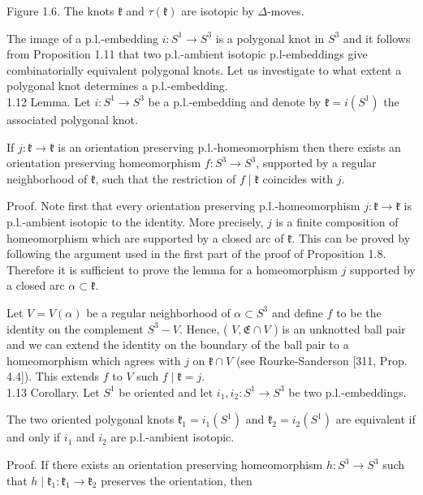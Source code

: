 \documentclass[10pt, letterpaper]{article}
\begin{document}
Figure 1.6. The knots $\mathfrak{k}$ and $\tau(\mathfrak{k})$ are isotopic by $\Delta$-moves.

The image of a p.l.-embedding $i: S^{1} \rightarrow S^{3}$ is a polygonal knot in $S^{3}$ and it follows from Proposition 1.11 that two p.l.-ambient isotopic p.l-embeddings give combinatorially equivalent polygonal knots. Let us investigate to what extent a polygonal knot determines a p.l.-embedding.\\
1.12 Lemma. Let $i: S^{1} \rightarrow S^{3}$ be a p.l.-embedding and denote by $\mathfrak{k}=i\left(S^{1}\right)$ the associated polygonal knot.

If $j: \mathfrak{k} \rightarrow \mathfrak{k}$ is an orientation preserving p.l.-homeomorphism then there exists an orientation preserving homeomorphism $f: S^{3} \rightarrow S^{3}$, supported by a regular neighborhood of $\mathfrak{k}$, such that the restriction of $f \mid \mathfrak{k}$ coincides with $j$.

Proof. Note first that every orientation preserving p.l.-homeomorphism $j: \mathfrak{k} \rightarrow \mathfrak{k}$ is p.l.-ambient isotopic to the identity. More precisely, $j$ is a finite composition of homeomorphism which are supported by a closed arc of $\mathfrak{k}$. This can be proved by following the argument used in the first part of the proof of Proposition 1.8. Therefore it is sufficient to prove the lemma for a homeomorphism $j$ supported by a closed arc $\alpha \subset \mathfrak{k}$.

Let $V=V(\alpha)$ be a regular neighborhood of $\alpha \subset S^{3}$ and define $f$ to be the identity on the complement $S^{3}-V$. Hence, ( $V, \mathfrak{E} \cap V$ ) is an unknotted ball pair and we can extend the identity on the boundary of the ball pair to a homeomorphism which agrees with $j$ on $\mathfrak{k} \cap V$ (see Rourke-Sanderson [311, Prop. 4.4]). This extends $f$ to $V$ such $f \mid \mathfrak{k}=j$.\\
1.13 Corollary. Let $S^{1}$ be oriented and let $i_{1}, i_{2}: S^{1} \rightarrow S^{3}$ be two p.l.-embeddings.

The two oriented polygonal knots $\mathfrak{k}_{1}=i_{1}\left(S^{1}\right)$ and $\mathfrak{k}_{2}=i_{2}\left(S^{1}\right)$ are equivalent if and only if $i_{1}$ and $i_{2}$ are p.l.-ambient isotopic.

Proof. If there exists an orientation preserving homeomorphism $h: S^{3} \rightarrow S^{3}$ such that $h \mid \mathfrak{k}_{1}: \mathfrak{k}_{1} \rightarrow \mathfrak{k}_{2}$ preserves the orientation, then
\end{document}
